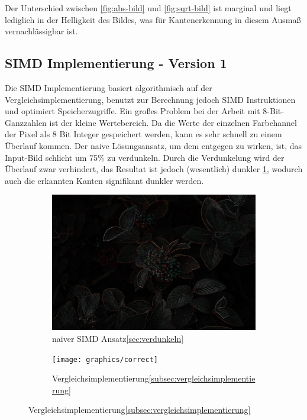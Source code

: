 \documentclass[course=erap]{aspdoc}
\begin{document}
Der Unterschied zwischen \ref{fig:abs-bild} und \ref{fig:sqrt-bild} ist marginal und liegt lediglich in der Helligkeit des Bildes, was für Kantenerkennung in diesem Ausmaß vernachlässigbar ist.
\subsection{SIMD Implementierung - Version 1}
\label{subsec:simd-implementierung}
Die SIMD Implementierung basiert algorithmisch auf der Vergleichsimplementierung, benutzt zur Berechnung jedoch SIMD Instruktionen und optimiert Speicherzugriffe.
Ein großes Problem bei der Arbeit mit 8-Bit-Ganzzahlen ist der kleine Wertebereich.
Da die Werte der einzelnen Farbchannel der Pixel als 8 Bit Integer gespeichert werden, kann es sehr schnell zu einem Überlauf kommen.
Der naive Lösungsansatz, um dem entgegen zu wirken, ist, das Input-Bild schlicht um 75\% zu verdunkeln. \label{sec:verdunkeln}
Durch die Verdunkelung wird der Überlauf zwar verhindert, das Resultat ist jedoch (wesentlich) dunkler {\ref{fig:dark}}, wodurch auch die erkannten Kanten signifikant dunkler werden.
\begin{figure}[H]
    \begin{subfigure}{.5\columnwidth}
        \centering
        \includegraphics[width=\columnwidth]{graphics/dark}
        \caption{naiver SIMD Ansatz\ref{sec:verdunkeln}}
        \label{fig:dark}
    \end{subfigure}
    \begin{subfigure}{.5\columnwidth}
        \centering
        \texttt{[image: graphics/correct]}
        \caption{Vergleichsimplementierung\ref{subsec:vergleichsimplementierung}}
        \label{fig:correct}
    \end{subfigure}
\end{figure}
\end{document}
